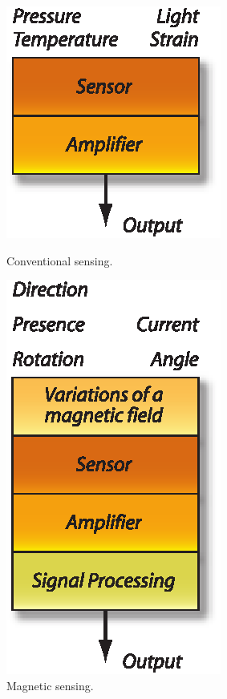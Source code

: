 \begin{subfigures}
\begin{figure}[!pbth]
 \centering\vfill
 \begin{minipage}{0.45\linewidth}\centering
      \includegraphics[width=.5\linewidth]{images/tradSensing}
 \caption[Traditional sensing]{Conventional sensing.}
 \label{fig:tradSensing}
 \end{minipage}\hfill
 \begin{minipage}{0.45\linewidth}\centering
  \includegraphics[width=.5\linewidth]{images/magnSensing}
 \caption[Magnetic sensing]{Magnetic sensing.}
 \label{fig:magnSensing}
 \end{minipage}
\end{figure}
\end{subfigures}

